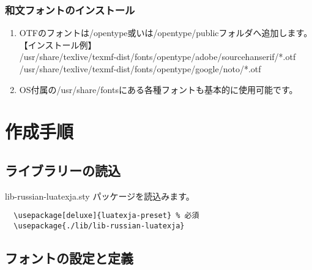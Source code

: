 \documentclass[a4paper,10pt]{ltjsarticle}
\def\colH#1{\color[HTML]{#1}}
\begin{document}
\subsubsection{和文フォントのインストール}

\begin{enumerate}
  \item OTFのフォントは/opentype或いは/opentype/publicフォルダへ追加します。\\
【インストール例】\\
/usr/share/texlive/texmf-dist/fonts/opentype/adobe/sourcehanserif/*.otf\\
/usr/share/texlive/texmf-dist/fonts/opentype/google/noto/*.otf  
  \item OS付属の/usr/share/fontsにある各種フォントも基本的に使用可能です。\vspace{-6mm}
\end{enumerate}

\section{作成手順}

\subsection{ライブラリーの読込}
{\colH{800000} lib-russian-luatexja.sty} パッケージを読込みます。
\vspace{-2mm}
\begin{verbatim}
  \usepackage[deluxe]{luatexja-preset} % 必須
  \usepackage{./lib/lib-russian-luatexja} 
\end{verbatim}
\vspace{-6mm}
    
\subsection{フォントの設定と定義}
\end{document}
